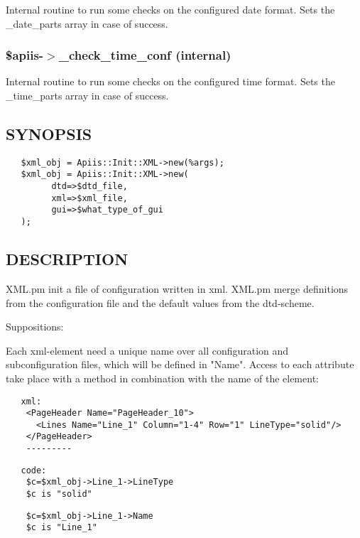 Internal routine to run some checks on the configured date format.
Sets the \_date\_parts array in case of success.

\subsubsection*{\$apiis-$>$\_check\_time\_conf (internal)\label{_apiis-_check_time_conf_internal_}}


Internal routine to run some checks on the configured time format.
Sets the \_time\_parts array in case of success.

\subsection{SYNOPSIS\label{SYNOPSIS}}
\begin{verbatim}
   $xml_obj = Apiis::Init::XML->new(%args);
   $xml_obj = Apiis::Init::XML->new(
         dtd=>$dtd_file,
         xml=>$xml_file,
         gui=>$what_type_of_gui
   );
\end{verbatim}
\subsection{DESCRIPTION\label{DESCRIPTION}}


XML.pm init a file of configuration written in xml. XML.pm merge definitions
from the configuration file and the default values from the dtd-scheme.



Suppositions:



Each xml-element need a unique name over all configuration and subconfiguration
files, which will be defined in "Name". Access to each attribute take place with
a method in combination with the name of the element:

\begin{verbatim}
   xml:
    <PageHeader Name="PageHeader_10">
      <Lines Name="Line_1" Column="1-4" Row="1" LineType="solid"/>
    </PageHeader>             
    ---------
\end{verbatim}
\begin{verbatim}
   code: 
    $c=$xml_obj->Line_1->LineType
    $c is "solid"
\end{verbatim}
\begin{verbatim}
    $c=$xml_obj->Line_1->Name
    $c is "Line_1"
\end{verbatim}


